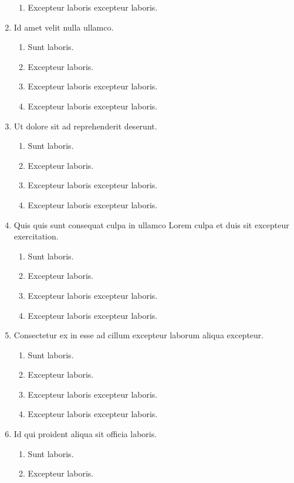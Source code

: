 \documentclass[a4paper,12pt]{article}
\begin{document}
\begin{enumerate}[label=\textbf{\arabic*.}]
\begin{enumerate}
    \item Excepteur laboris excepteur laboris.
  \end{enumerate}
  \item Id amet velit nulla ullamco.
  \begin{enumerate}
    \item Sunt laboris.
    \item Excepteur laboris.
    \item Excepteur laboris excepteur laboris.
    \item Excepteur laboris excepteur laboris.
  \end{enumerate}
  \item Ut dolore sit ad reprehenderit deserunt.
  \begin{enumerate}
    \item Sunt laboris.
    \item Excepteur laboris.
    \item Excepteur laboris excepteur laboris.
    \item Excepteur laboris excepteur laboris.
  \end{enumerate}
  \item Quis quis sunt consequat culpa in ullamco Lorem culpa et duis sit excepteur exercitation.
  \begin{enumerate}
    \item Sunt laboris.
    \item Excepteur laboris.
    \item Excepteur laboris excepteur laboris.
    \item Excepteur laboris excepteur laboris.
  \end{enumerate}
  \item Consectetur ex in esse ad cillum excepteur laborum aliqua excepteur.
  \begin{enumerate}
    \item Sunt laboris.
    \item Excepteur laboris.
    \item Excepteur laboris excepteur laboris.
    \item Excepteur laboris excepteur laboris.
  \end{enumerate}
  \item Id qui proident aliqua sit officia laboris.
  \begin{enumerate}
    \item Sunt laboris.
    \item Excepteur laboris.

\end{enumerate}
\end{enumerate}
\end{document}
